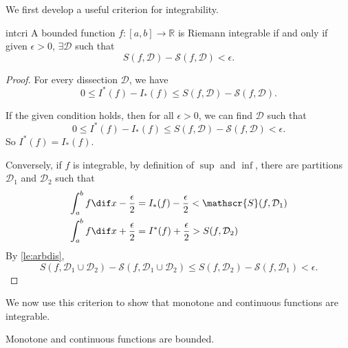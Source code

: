 We first develop a useful criterion for integrability.
\begin{theorem}{}{intcri}
    A bounded function \(f: [a,b] \to \mathbb{R}\) is Riemann integrable if and only if given \(\epsilon > 0\), \(\exists \mathcal{D}\) such that
    \[
        S(f, \mathcal{D}) - \mathscr{S}(f,\mathcal{D}) < \epsilon.
    \]
\end{theorem}
\begin{proof}
    For every dissection \(\mathcal{D}\), we have
    \[
        0 \leq I^*(f) - I_*(f) \leq S(f, \mathcal{D}) - \mathscr{S}(f,\mathcal{D}).
    \]

    If the given condition holds, then for all \(\epsilon > 0\), we can find \(\mathcal{D}\) such that
    \[
        0 \leq I^*(f) - I_*(f) \leq S(f, \mathcal{D}) - \mathscr{S}(f,\mathcal{D}) < \epsilon.
    \]
    So \(I^*(f) = I_*(f)\).

    Conversely, if \(f\) is integrable, by definition of \(\sup\) and \(\inf\), there are partitions \(\mathcal{D}_1\) and \(\mathcal{D}_2\) such that
    \begin{align*}
        \int_a^b f \dif x - \frac{\epsilon}{2} &= I_*(f) - \frac{\epsilon}{2} < \mathscr{S}(f, \mathcal{D}_1)\\
        \int_a^b f \dif x + \frac{\epsilon}{2} &= I^*(f) + \frac{\epsilon}{2} > S(f, \mathcal{D}_2)
    \end{align*}
    By \cref{le:arbdis},
    \[
        S(f, \mathcal{D}_1\cup \mathcal{D}_2) - \mathscr{S}(f, \mathcal{D}_1\cup \mathcal{D}_2)\leq S(f,\mathcal{D}_2) - \mathscr{S}(f,\mathcal{D}_1) < \epsilon.
    \]
\end{proof}

We now use this criterion to show that monotone and continuous functions are integrable.

\begin{remark}
    Monotone and continuous functions are bounded.
\end{remark}

